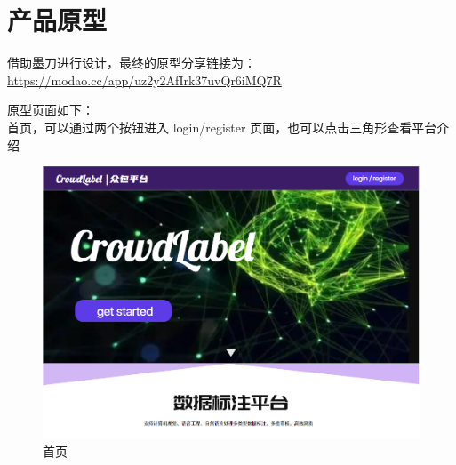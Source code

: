 \section{产品原型}

借助墨刀进行设计，最终的原型分享链接为：\url{https://modao.cc/app/uz2y2AfIrk37uvQr6iMQ7R}

原型页面如下：\\

首页，可以通过两个按钮进入 login/register 页面，也可以点击三角形查看平台介绍

\begin{figure}[h!]
    \centering
    \includegraphics[width=\linewidth]{imgs/prototype/home.png}
    \caption{首页}
    \label{fig:proto_home}
\end{figure}

